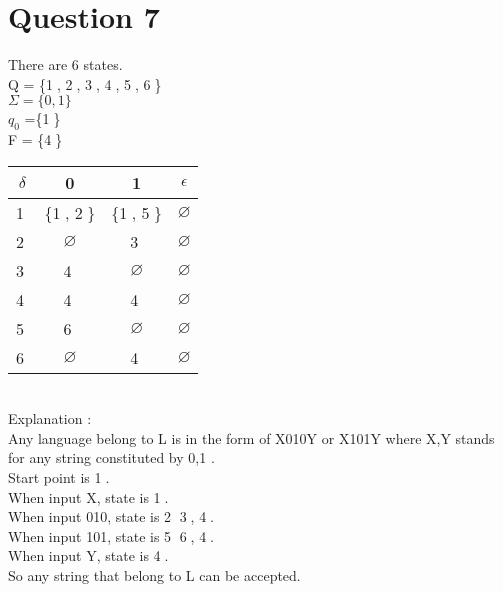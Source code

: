 \documentclass[a4paper]{article}
\begin{document}

\section{Question 7}
There are 6 states.\\
Q = \{\textcircled{1}, \textcircled{2}, \textcircled{3}, \textcircled{4}, \textcircled{5}, \textcircled{6}\}\\
$\Sigma = \{0, 1\}$\\
$q_{0}$ =\{\textcircled{1}\}\\
F = \{\textcircled{4}\}\\
\begin{tabular}{|c|c|c|c|}
\hline
$\delta$ & 0 & 1 & $\epsilon$  \\ 
\hline
\textcircled{1} &  \{\textcircled{1}, \textcircled{2}\} & \{\textcircled{1}, \textcircled{5}\} & $\varnothing$ \\
\hline
\textcircled{2} & $\varnothing$ & \textcircled{3} & $\varnothing$ \\
\hline
\textcircled{3} & \textcircled{4} & $\varnothing$ & $\varnothing$ \\
\hline
\textcircled{4} & \textcircled{4} & \textcircled{4}  & $\varnothing$ \\
\hline
\textcircled{5} & \textcircled{6} & $\varnothing$   & $\varnothing$ \\
\hline
\textcircled{6} & $\varnothing$ & \textcircled{4}  & $\varnothing$ \\
\hline

\end{tabular}\\
Explanation :\\
Any language belong to L is in the form of X010Y or X101Y where X,Y stands for any string constituted by {0,1} .\\
Start point is \textcircled{1}.\\
When input X, state is \textcircled{1}.\\
When input 010, state is \textcircled{2} \textcircled{3}, \textcircled{4}.\\
When input 101, state is \textcircled{5} \textcircled{6}, \textcircled{4}.\\
When input Y, state is \textcircled{4}.\\
So any string that belong to L can be accepted.

\end{document}
